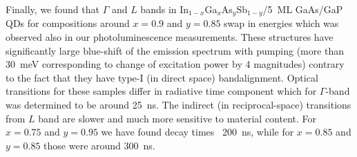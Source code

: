 Finally, we found that $\Gamma$ and $L$ bands in In$_{1-x}$Ga$_x$As$_y$Sb$_{1-y}$/5~ML GaAs/GaP QDs for compositions around $x=0.9$ and $y=0.85$ swap in energies which was observed also in our photoluminescence measurements. These structures have significantly large blue-shift of the emission spectrum with pumping (more than 30~meV corresponding to change of excitation power by 4 magnitudes) contrary to the fact that they have type-I (in direct space) bandalignment. Optical transitions for these samples differ in radiative time component which for $\Gamma$-band was determined to be around 25~ns. The indirect (in reciprocal-space) transitions from $L$ band are slower and much more sensitive to material content. For $x=0.75$ and $y=0.95$ we have found decay times ~200~ns, while for $x=0.85$ and $y=0.85$ those were around 300~ns.


\newpage

\newpage 